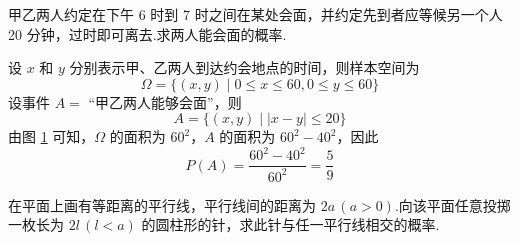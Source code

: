\begin{example}[][会面问题]
    \indent 甲乙两人约定在下午 6 时到 7 时之间在某处会面，并约定先到者应等候另一个人 20 分钟，过时即可离去.求两人能会面的概率.
\end{example}

\begin{solution}
    设 $x$ 和 $y$ 分别表示甲、乙两人到达约会地点的时间，则样本空间为
    $$
    \varOmega = \{ (x,y) \mid 0 \leqslant x \leqslant 60, 0 \leqslant y \leqslant 60 \}
    $$
    设事件 $A=$ “甲乙两人能够会面”，则
    $$
    A = \{ (x,y) \mid |x-y| \leqslant 20 \}
    $$
    由图 \ref{fig:会面问题} 可知，$\varOmega$ 的面积为 $60^2$，$A$ 的面积为 $60^2 - 40^2$，因此
    $$
    P(A) = \dfrac{60^2 - 40^2}{60^2} = \dfrac{5}{9}
    $$

    \begin{figure}[H]
        \centering


        \caption{}
        \label{fig:会面问题}
    \end{figure}
\end{solution}

\begin{example}[][蒲丰投针问题]
    \indent 在平面上画有等距离的平行线，平行线间的距离为 $2a \, (a>0)$.向该平面任意投掷一枚长为 $2l \, (l<a)$ 的圆柱形的针，求此针与任一平行线相交的概率.
\end{example}

